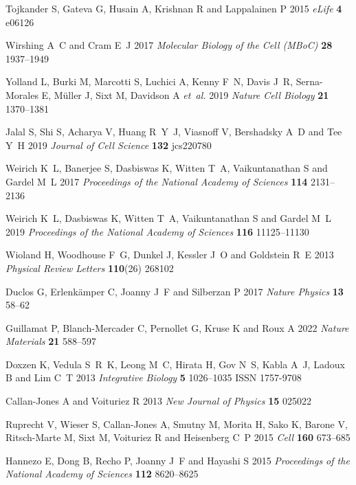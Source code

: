 \documentclass[12pt]{iopart}
\begin{document}
\begin{thebibliography}{100}
				Tojkander S, Gateva G, Husain A, Krishnan R and Lappalainen P 2015 {\em
				  eLife\/} {\bf 4} e06126
				
				Wirshing A~C and Cram E~J 2017 {\em Molecular Biology of the Cell (MBoC)\/}
				  {\bf 28} 1937--1949
				
				Yolland L, Burki M, Marcotti S, Luchici A, Kenny F~N, Davis J~R, Serna-Morales
				  E, M{\"u}ller J, Sixt M, Davidson A {\em et~al.\/} 2019 {\em Nature Cell
				  Biology\/} {\bf 21} 1370--1381
				
				Jalal S, Shi S, Acharya V, Huang R~Y~J, Viasnoff V, Bershadsky A~D and Tee Y~H
				  2019 {\em Journal of Cell Science\/} {\bf 132} jcs220780
				
				Weirich K~L, Banerjee S, Dasbiswas K, Witten T~A, Vaikuntanathan S and Gardel
				  M~L 2017 {\em Proceedings of the National Academy of Sciences\/} {\bf 114}
				  2131--2136
				
				Weirich K~L, Dasbiswas K, Witten T~A, Vaikuntanathan S and Gardel M~L 2019 {\em
				  Proceedings of the National Academy of Sciences\/} {\bf 116} 11125--11130
				
				Wioland H, Woodhouse F~G, Dunkel J, Kessler J~O and Goldstein R~E 2013 {\em
				  Physical Review Letters\/} {\bf 110}(26) 268102
				
				Duclos G, Erlenk{\"a}mper C, Joanny J~F and Silberzan P 2017 {\em Nature
				  Physics\/} {\bf 13} 58--62
				
				Guillamat P, Blanch-Mercader C, Pernollet G, Kruse K and Roux A 2022 {\em
				  Nature Materials\/} {\bf 21} 588--597
				
				Doxzen K, Vedula S~R~K, Leong M~C, Hirata H, Gov N~S, Kabla A~J, Ladoux B and
				  Lim C~T 2013 {\em Integrative Biology\/} {\bf 5} 1026--1035 ISSN 1757-9708
				
				Callan-Jones A and Voituriez R 2013 {\em New Journal of Physics\/} {\bf 15}
				  025022
				
				Ruprecht V, Wieser S, Callan-Jones A, Smutny M, Morita H, Sako K, Barone V,
				  Ritsch-Marte M, Sixt M, Voituriez R and Heisenberg C~P 2015 {\em Cell\/} {\bf
				  160} 673--685
				
				Hannezo E, Dong B, Recho P, Joanny J~F and Hayashi S 2015 {\em Proceedings of
				  the National Academy of Sciences\/} {\bf 112} 8620--8625
				

\end{thebibliography}
\end{document}
